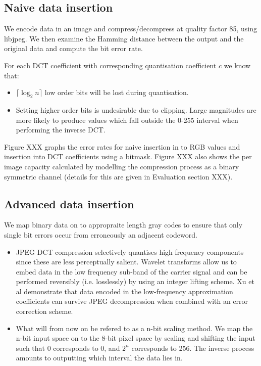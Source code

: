 \subsection{Naive data insertion}

We encode data in an image and compress/decompress at quality factor 85, using libjpeg. We then examine the Hamming distance between the output and the original data and compute the bit error rate.

For each DCT coefficient with corresponding quantisation coefficient $c$ we know that:

\begin{itemize}

    \item $ \lceil \log_2 n \rceil $ low order bits will be lost during quantisation.
    
    \item Setting higher order bits is undesirable due to clipping. Large magnitudes are more likely to produce values which fall outside the 0-255 interval when performing the inverse DCT. 

\end{itemize}

Figure XXX graphs the error rates for naive insertion in to RGB values and insertion into DCT coefficients using a bitmask. Figure XXX also shows the per image capacity calculated by modelling the compression process as a binary symmetric channel (details for this are given in Evaluation section XXX).


\subsection{Advanced data insertion}

We map binary data on to appropraite length gray codes to ensure that only single bit errors occur from erroneously an adjacent codeword.

\begin{itemize}

    \item JPEG DCT compression selectively quantises high frequency components since these are less perceptually salient. Wavelet transforms allow us to embed data in the low frequency sub-band of the carrier signal and can be performed reversibly (i.e. losslessly) by using an integer lifting scheme. Xu et al demonstrate that \cite{haar} data encoded in the low-frequency approximation coefficients can survive JPEG decompression when combined with an error correction scheme.
    
    \item What will from now on be refered to as a n-bit scaling method. We map the n-bit input space on to the 8-bit pixel space by scaling and shifting the input such that 0 corresponds to 0, and $2^n$ corresponds to 256. The inverse process amounts to outputting which interval the data lies in.

\end{itemize}

